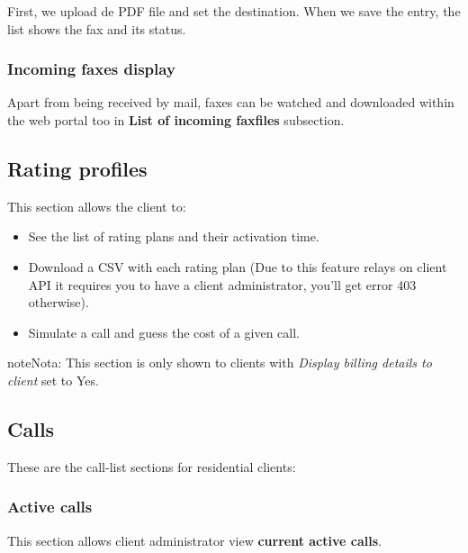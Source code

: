 \documentclass[letterpaper,10pt,spanish]{sphinxmanual}
\begin{document}
First, we upload de PDF file and set the destination. When we save the entry, the list shows the fax and its status.


\subsubsection{Incoming faxes display}
\label{administration_portal/client/residential/faxes:incoming-faxes-display}
Apart from being received by mail, faxes can be watched and downloaded within
the web portal too in \textbf{List of incoming faxfiles} subsection.


\subsection{Rating profiles}
\label{administration_portal/client/residential/rating_profiles:rating-profiles}\label{administration_portal/client/residential/rating_profiles::doc}
This section allows the client to:
\begin{itemize}
\item {} 
See the list of rating plans and their activation time.

\item {} 
Download a CSV with each rating plan (Due to this feature relays on client API it requires you to have a client administrator, you'll get error 403 otherwise).

\item {} 
Simulate a call and guess the cost of a given call.

\end{itemize}

\begin{notice}{note}{Nota:}
This section is only shown to clients with \emph{Display billing details to client} set to Yes.
\end{notice}


\subsection{Calls}
\label{administration_portal/client/residential/calls/index::doc}\label{administration_portal/client/residential/calls/index:calls}
These are the call-list sections for residential clients:


\subsubsection{Active calls}
\label{administration_portal/client/residential/calls/active_calls::doc}\label{administration_portal/client/residential/calls/active_calls:active-calls}
This section allows client administrator view \textbf{current active calls}.
\end{document}

